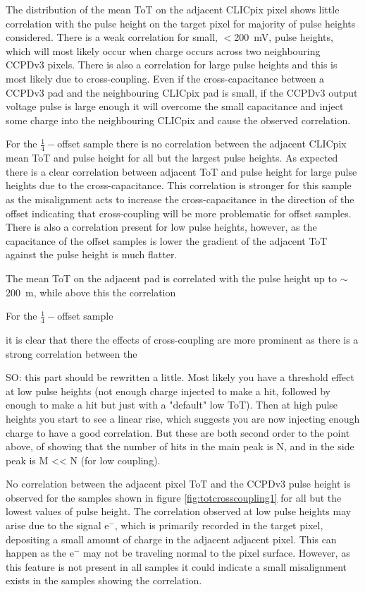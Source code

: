 
The distribution of the mean ToT on the adjacent CLICpix pixel shows little correlation with the pulse height on the target pixel for majority of pulse heights considered.  There is a weak correlation for small, $<$200~mV, pulse heights, which will most likely occur when charge occurs across two neighbouring CCPDv3 pixels.  There is also a correlation for large pulse heights and this is most likely due to cross-coupling.  Even if the cross-capacitance between a CCPDv3 pad and the neighbouring CLICpix pad is small, if the CCPDv3 output voltage pulse is large enough it will overcome the small capacitance and inject some charge into the neighbouring CLICpix and cause the observed correlation.  

For the $\frac{1}{4}-$offset sample there is no correlation between the adjacent CLICpix mean ToT and pulse height for all but the largest pulse heights.  As expected there is a clear correlation between adjacent ToT and pulse height for large pulse heights due to the cross-capacitance.  This correlation is stronger for this sample as the misalignment acts to increase the cross-capacitance in the direction of the offset indicating that cross-coupling will be more problematic for offset samples.  There is also a correlation present for low pulse heights, however, as the capacitance of the offset samples is lower the gradient of the adjacent ToT against the pulse height is much flatter.


The mean ToT on the adjacent pad is correlated with the pulse height up to $\sim$200~m, while above this the correlation 

For the $\frac{1}{4}-$offset sample 

it is clear that there the effects of cross-coupling are more prominent as there is a strong correlation between the  

SO: this part should be rewritten a little. Most likely you have a threshold effect at low pulse heights (not enough charge injected to make a hit, followed by enough to make a hit but just with a "default" low ToT). Then at high pulse heights you start to see a linear rise, which suggests you are now injecting enough charge to have a good correlation. But these are both second order to the point above, of showing that the number of hits in the main peak is N, and in the side peak is M << N (for low coupling).

No correlation between the adjacent pixel ToT and the CCPDv3 pulse height is observed for the samples shown in figure \ref{fig:totcrosscoupling1} for all but the lowest values of pulse height.  The correlation observed at low pulse heights may arise due to the signal $\text{e}^{-}$, which is primarily recorded in the target pixel, depositing a small amount of charge in the adjacent adjacent pixel.  This can happen as the $\text{e}^{-}$ may not be traveling normal to the pixel surface.  However, as this feature is not present in all samples it could indicate a small misalignment exists in the samples showing the correlation.  

